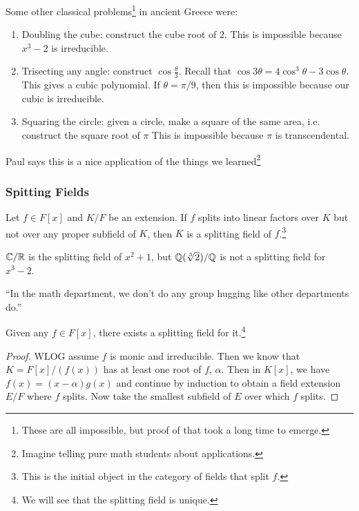 \documentclass[10pt, twoside]{article}
\begin{document}
    Some other classical problems\footnote{These are all impossible, but proof of that took a long time to emerge.} in ancient Greece were:
    \begin{enumerate}
        \item Doubling the cube: construct the cube root of $2$. This is impossible because $x^3-2$ is irreducible.
        \item Trisecting any angle: construct $\cos \frac{\theta}{3}$. Recall that $\cos 3\theta = 4 \cos^3 \theta - 3 \cos \theta$. This gives a cubic polynomial. If $\theta=\pi/9$, then this is impossible because our cubic is irreducible.
        \item Squaring the circle: given a circle, make a square of the same area, i.e. construct the square root of $\pi$ This is impossible because $\pi$ is transcendental.
    \end{enumerate}

    Paul says this is a nice application of the things we learned\footnote{Imagine telling pure math students about applications.}

    \subsubsection{Spitting Fields}
    \begin{defn}
        Let $f \in F[x]$ and $K/F$ be an extension. If $f$ splits into linear factors over $K$ but not over any proper subfield of $K$, then $K$ is a splitting field of $f$.\footnote{This is the initial object in the category of fields that split $f$.}
    \end{defn}

    \begin{exm}
        $\mathbb{C}/\mathbb{R}$ is the splitting field of $x^2+1$, but $\mathbb{Q}(\sqrt[3]{2})/\mathbb{Q}$ is not a splitting field for $x^3-2$.
    \end{exm}

    ``In the math department, we don't do any group hugging like other departments do.''

    \begin{thm}
        Given any $f \in F[x]$, there exists a splitting field for it.\footnote{We will see that the splitting field is unique.}
        \begin{proof}
            WLOG assume $f$ is monic and irreducible. Then we know that $K = F[x]/(f(x))$ has at least one root of $f$, $\alpha$. Then in $K[x]$, we have $f(x) = (x-\alpha)g(x)$ and continue by induction to obtain a field extension $E/F$ where $f$ splits. Now take the smallest subfield of $E$ over which $f$ splits.
        \end{proof}
    \end{thm}
\end{document}
